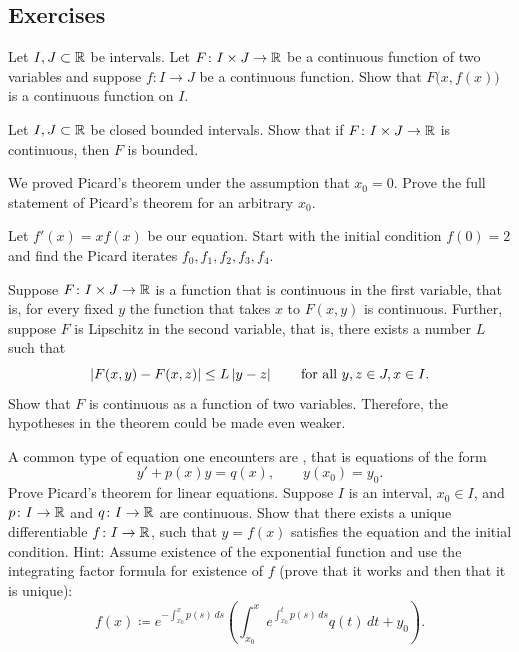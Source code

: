 \subsection{Exercises}

\begin{exercise}
Let $I, J \subset {\mathbb{R}}$ be intervals.
Let $F \colon I \times J \to {\mathbb{R}}$ be a continuous function
of two variables
and suppose $f \colon I \to J$ be a continuous function.
Show that $F\bigl(x,f(x)\bigr)$ is a continuous function on $I$.
\end{exercise}

\begin{exercise}
Let $I, J \subset {\mathbb{R}}$ be closed bounded intervals.
Show that if $F \colon I \times J \to {\mathbb{R}}$ is continuous,
then $F$ is bounded.
\end{exercise}

\begin{exercise}
We proved Picard's theorem under the assumption that $x_0 = 0$.
Prove the full statement of Picard's theorem for an arbitrary $x_0$.
\end{exercise}

\begin{exercise}
Let $f'(x)=x f(x)$ be our equation.  Start with the initial condition
$f(0)=2$ and find the Picard iterates $f_0,f_1,f_2,f_3,f_4$.
\end{exercise}

\begin{exercise}
Suppose $F \colon I \times J \to {\mathbb{R}}$
is a function that is continuous in the first variable,
that is, for every fixed $y$ the function that takes $x$ to $F(x,y)$ is
continuous.  Further, suppose $F$ is Lipschitz in the second variable,
that is, there exists a number $L$ such that
\begin{equation*}
\left\lvert {F(x,y) - F(x,z)} \right\rvert \leq L \left\lvert {y-z} \right\rvert
\qquad \text{for all } y,z \in J, x \in I .
\end{equation*}
Show that $F$ is continuous as a function of two variables.  Therefore, the
hypotheses in the theorem could be made even weaker.
\end{exercise}

\begin{exercise}
\pagebreak[2]
A common type of equation one encounters are
\emph{}, that is
equations of the form
\begin{equation*}
y' + p(x) y = q(x) , \qquad y(x_0) = y_0 .
\end{equation*}
Prove Picard's theorem for linear equations.  Suppose $I$ is an
interval, $x_0 \in I$, and $p \colon I \to {\mathbb{R}}$ and $q \colon I \to {\mathbb{R}}$ are
continuous.
Show that there exists a unique differentiable $f \colon I \to {\mathbb{R}}$,
such that $y = f(x)$
satisfies the equation and the initial condition.
Hint: Assume existence of the exponential function and use the integrating
factor formula for existence of $f$ (prove that it works and then that it is unique):
\begin{equation*}
f(x) \coloneqq e^{-\int_{x_0}^x p(s)\, ds} \left( \int_{x_0}^x e^{\int_{x_0}^t p(s)\, ds}
q(t) \,dt + y_0 \right).
\end{equation*}
\end{exercise}

